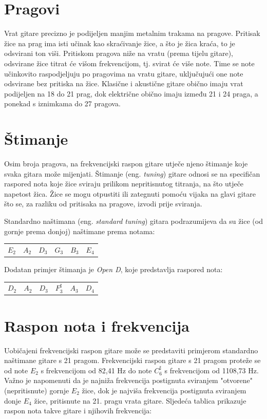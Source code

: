 \documentclass[times, utf8, diplomski, numeric]{fer}
\begin{document}
\section{Pragovi}
Vrat gitare precizno je podijeljen manjim metalnim trakama na pragove. Pritisak žice na prag ima isti učinak kao skraćivanje žice, a što je žica kraća, to je odsvirani ton viši. Pritiskom pragova niže na vratu (prema tijelu gitare), odsvirane žice titrat će višom frekvencijom, tj. svirat će više note. Time se note učinkovito raspodjeljuju po pragovima na vratu gitare, uključujući one note odsvirane bez pritiska na žice. Klasične i akustične gitare obično imaju vrat podijeljen na 18 do 21 prag, dok električne obično imaju između 21 i 24 praga, a ponekad s iznimkama do 27 pragova.

\section{Štimanje}
Osim broja pragova, na frekvencijski raspon gitare utječe njeno štimanje koje svaka gitara može mijenjati. Štimanje (eng. \textit{tuning}) gitare odnosi se na specifičan raspored nota koje žice sviraju prilikom nepritisnutog titranja, na što utječe napetost žica. Žice se mogu otpustiti ili zategnuti pomoću vijaka na glavi gitare što se, za razliku od pritisaka na pragove, izvodi prije sviranja. 

Standardno naštimana (eng. \textit{standard tuning}) gitara podrazumijeva da su žice (od gornje prema donjoj) naštimane prema notama:
\begin{center}
	\begin{tabular}{c c c c c c}
		$E_2$ & $A_2$ & $D_3$ & $G_3$ & $B_3$ & $E_4$\\
	\end{tabular}
\end{center}

Dodatan primjer štimanja je \textit{Open D}, koje predstavlja raspored nota:
\begin{center}
	\begin{tabular}{c c c c c c}
		$D_2$ & $A_2$ & $D_3$ & $F_3^\sharp$ & $A_3$ & $D_4$\\
	\end{tabular}
\end{center}

\section{Raspon nota i frekvencija}
Uobičajeni frekvencijski raspon gitare može se predstaviti primjerom standardno naštimane gitare s 21 pragom. Frekvencijski raspon gitare s 21 pragom proteže se od note $E_2$ s frekvencijom od 82,41 Hz do note $C_6^\sharp$ s frekvencijom od 1108,73 Hz. Važno je napomenuti da je najniža frekvencija postignuta sviranjem "otvorene" (nepritisnute) gornje $E_2$ žice, dok je najviša frekvencija postignuta sviranjem donje $E_4$ žice, pritisnute na 21. pragu vrata gitare. Sljedeća tablica prikazuje raspon nota takve gitare i njihovih frekvencija:
\end{document}
